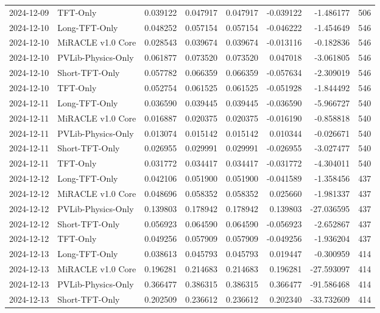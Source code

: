 \begin{tabular}{llrrrrrr}
2024-12-09 & TFT-Only & 0.039122 & 0.047917 & 0.047917 & -0.039122 & -1.486177 & 506 \\
2024-12-10 & Long-TFT-Only & 0.048252 & 0.057154 & 0.057154 & -0.046222 & -1.454649 & 546 \\
2024-12-10 & MiRACLE v1.0 Core & 0.028543 & 0.039674 & 0.039674 & -0.013116 & -0.182836 & 546 \\
2024-12-10 & PVLib-Physics-Only & 0.061877 & 0.073520 & 0.073520 & 0.047018 & -3.061805 & 546 \\
2024-12-10 & Short-TFT-Only & 0.057782 & 0.066359 & 0.066359 & -0.057634 & -2.309019 & 546 \\
2024-12-10 & TFT-Only & 0.052754 & 0.061525 & 0.061525 & -0.051928 & -1.844492 & 546 \\
2024-12-11 & Long-TFT-Only & 0.036590 & 0.039445 & 0.039445 & -0.036590 & -5.966727 & 540 \\
2024-12-11 & MiRACLE v1.0 Core & 0.016887 & 0.020375 & 0.020375 & -0.016190 & -0.858818 & 540 \\
2024-12-11 & PVLib-Physics-Only & 0.013074 & 0.015142 & 0.015142 & 0.010344 & -0.026671 & 540 \\
2024-12-11 & Short-TFT-Only & 0.026955 & 0.029991 & 0.029991 & -0.026955 & -3.027477 & 540 \\
2024-12-11 & TFT-Only & 0.031772 & 0.034417 & 0.034417 & -0.031772 & -4.304011 & 540 \\
2024-12-12 & Long-TFT-Only & 0.042106 & 0.051900 & 0.051900 & -0.041589 & -1.358456 & 437 \\
2024-12-12 & MiRACLE v1.0 Core & 0.048696 & 0.058352 & 0.058352 & 0.025660 & -1.981337 & 437 \\
2024-12-12 & PVLib-Physics-Only & 0.139803 & 0.178942 & 0.178942 & 0.139803 & -27.036595 & 437 \\
2024-12-12 & Short-TFT-Only & 0.056923 & 0.064590 & 0.064590 & -0.056923 & -2.652867 & 437 \\
2024-12-12 & TFT-Only & 0.049256 & 0.057909 & 0.057909 & -0.049256 & -1.936204 & 437 \\
2024-12-13 & Long-TFT-Only & 0.038613 & 0.045793 & 0.045793 & 0.019447 & -0.300959 & 414 \\
2024-12-13 & MiRACLE v1.0 Core & 0.196281 & 0.214683 & 0.214683 & 0.196281 & -27.593097 & 414 \\
2024-12-13 & PVLib-Physics-Only & 0.366477 & 0.386315 & 0.386315 & 0.366477 & -91.586468 & 414 \\
2024-12-13 & Short-TFT-Only & 0.202509 & 0.236612 & 0.236612 & 0.202340 & -33.732609 & 414 \\

\end{tabular}
